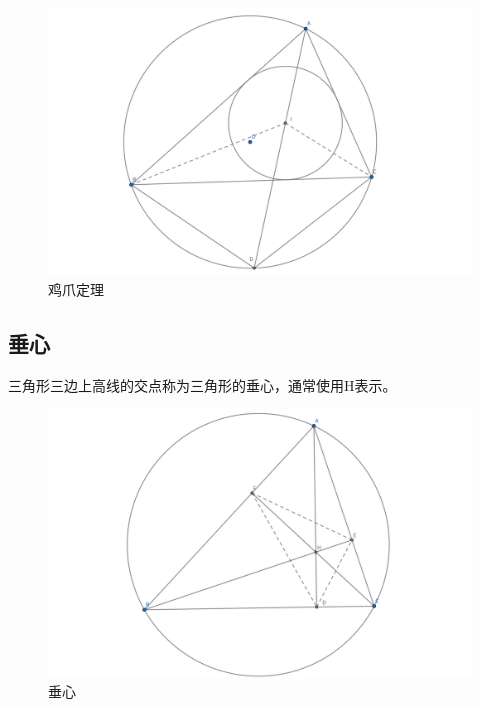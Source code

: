 \begin{figure}[ht]
    \centering
    \includegraphics[width=\linewidth]{figures/内心-鸡爪定理.png}
    \caption{鸡爪定理}
\end{figure}





\newpage
\subsection{垂心}
\begin{definition}[垂心]
    三角形三边上高线的交点称为三角形的垂心，通常使用H表示。
\end{definition}

\begin{figure}[htbp]
    \centering
    \includegraphics[width=\linewidth]{figures/垂足三角形.png}
    \caption{垂心}
\end{figure}

